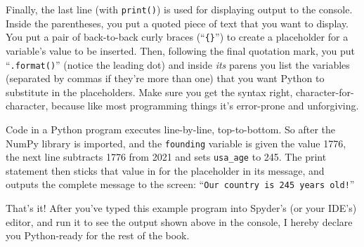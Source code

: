 \medskip

Finally, the last line (with \texttt{print()}) is used for displaying output to
the console. Inside the parentheses, you put a quoted piece of text that you
want to display. You put a pair of back-to-back curly braces
(``\texttt{\{\}}'') to create a placeholder for a variable's value to be
inserted. Then, following the final quotation mark, you put
``\texttt{.format()}'' (notice the leading dot) and inside \textit{its} parens
you list the variables (separated by commas if they're more than one) that you
want Python to substitute in the placeholders. Make sure you get the syntax
right, character-for-character, because like most programming things it's
error-prone and unforgiving.

\medskip

Code in a Python program executes line-by-line, top-to-bottom. So after the
NumPy library is imported, and the \texttt{founding} variable is given the
value 1776, the next line subtracts 1776 from 2021 and sets \texttt{usa\_age}
to 245. The print statement then sticks that value in for the placeholder in
its message, and outputs the complete message to the screen: ``\texttt{Our
country is 245 years old!}''

\bigskip

That's it! After you've typed this example program into Spyder's (or your
IDE's) editor, and run it to see the output shown above in the console, I
hereby declare you Python-ready for the rest of the book.
